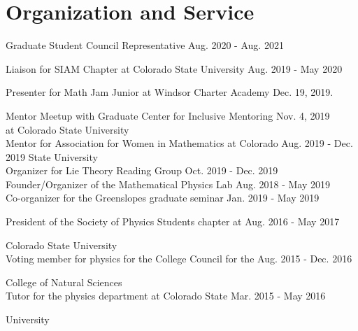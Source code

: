 \documentclass[12pt]{article} %
\begin{document}
\section{Organization and Service}
\begin{flushleft}
Graduate Student Council Representative \hfill Aug. 2020 - Aug. 2021\\
\vspace*{5pt}

Liaison for SIAM Chapter at Colorado State University \hfill Aug. 2019 - May 2020\\
\vspace*{5pt}

Presenter for Math Jam Junior at Windsor Charter Academy \hfill Dec. 19, 2019.\\
\vspace*{5pt}

Mentor Meetup with Graduate Center for Inclusive Mentoring \hfill Nov. 4, 2019\\

\noindent  at Colorado State University\\
\vspace*{5pt}
Mentor for Association for Women in Mathematics at Colorado \hfill Aug. 2019 - Dec. 2019
\noindent  State University\\
\vspace*{5pt}
Organizer for Lie Theory Reading Group \hfill Oct. 2019 - Dec. 2019\\
\vspace*{5pt}
Founder/Organizer of the Mathematical Physics Lab \hfill Aug. 2018 - May 2019\\
\vspace*{5pt}
Co-organizer for the Greenslopes graduate seminar \hfill Jan. 2019 - May 2019\\
\vspace*{5pt}

President of the Society of Physics Students chapter at \hfill Aug. 2016 - May 2017

\noindent Colorado State University\\
\vspace*{5pt}
Voting member for physics for the College Council for the \hfill Aug. 2015 - Dec. 2016

\noindent College of Natural Sciences\\
\vspace*{5pt}
Tutor for the physics department at Colorado State \hfill Mar. 2015 - May 2016

\noindent University
\end{flushleft}
\noindent\makebox[\textwidth]{\rule{\textwidth}{0.5mm}}
\end{document}
